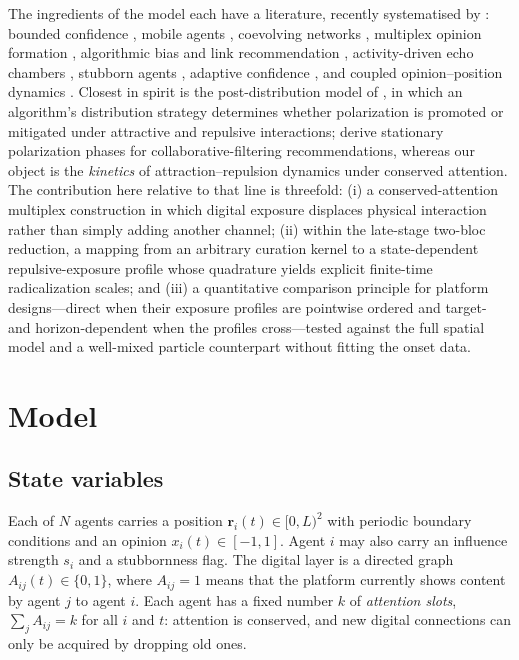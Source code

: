 \documentclass[5p,times,twocolumn]{elsarticle}
\newcommand{\rr}{\mathbf{r}}
\begin{document}
The ingredients of the model each have a literature, recently
systematised by \citet{starnini2025}: bounded confidence
\citep{deffuant2000, hegselmann2002, lorenz2007, castellano2009,
bernardo2024}, mobile agents \citep{alraddadi2024}, coevolving networks
\citep{holme2006}, multiplex opinion formation \citep{antonopoulos2018},
algorithmic bias and link recommendation \citep{sirbu2019, santos2021,
pansanella2022}, activity-driven echo chambers \citep{baumann2020},
stubborn agents \citep{tian2018}, adaptive confidence \citep{li2025}, and
coupled opinion--position dynamics \citep{djurdjevac2024, pasimeni2025}.
Closest in spirit is the post-distribution model of \citet{dearruda2022},
in which an algorithm's distribution strategy determines whether
polarization is promoted or mitigated under attractive and repulsive
interactions; \citet{bellina2023} derive stationary polarization phases
for collaborative-filtering recommendations, whereas our object is the
\emph{kinetics} of attraction--repulsion dynamics under conserved
attention. The contribution here relative to that line is threefold:
(i) a conserved-attention multiplex construction in which digital exposure
displaces physical interaction rather than simply adding another channel;
(ii) within the late-stage two-bloc reduction, a mapping from an arbitrary
curation kernel to a state-dependent repulsive-exposure profile whose
quadrature yields explicit finite-time radicalization scales; and (iii) a
quantitative comparison principle for platform designs---direct when their
exposure profiles are pointwise ordered and target- and horizon-dependent
when the profiles cross---tested against the full spatial model and a
well-mixed particle counterpart without fitting the onset data.

\section{Model}
\label{sec:model}

\subsection{State variables}

Each of $N$ agents carries a position $\rr_i(t) \in [0,L)^2$ with periodic
boundary conditions and an opinion $x_i(t) \in [-1,1]$. Agent $i$ may also
carry an influence strength $s_i$ and a stubbornness flag. The digital
layer is a directed graph $A_{ij}(t) \in \{0,1\}$, where $A_{ij}=1$ means
that the platform currently shows content by agent $j$ to agent $i$. Each
agent has a fixed number $k$ of \emph{attention slots}, $\sum_j A_{ij} = k$
for all $i$ and $t$: attention is conserved, and new digital connections
can only be acquired by dropping old ones.
\end{document}
